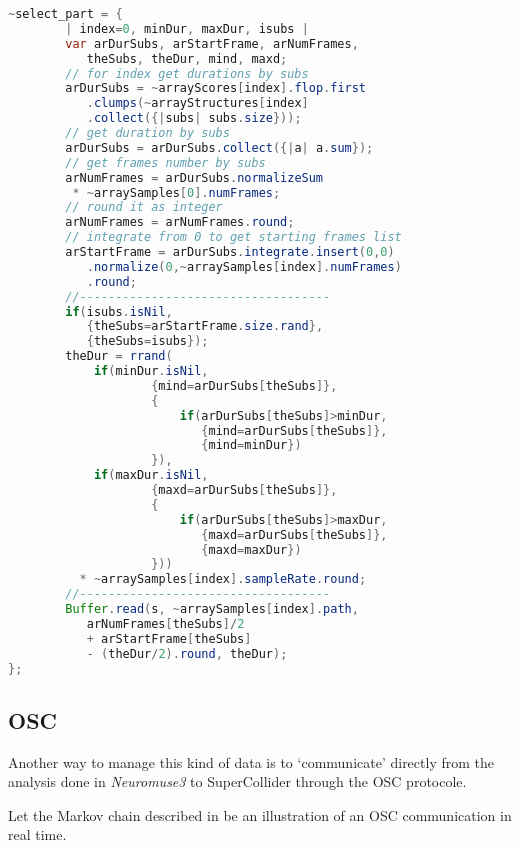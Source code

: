 \begin{enumerate}
 \begin{lstlisting}[basicstyle=\footnotesize\ttfamily,language=Java]
~select_part = {
        | index=0, minDur, maxDur, isubs |
        var arDurSubs, arStartFrame, arNumFrames, 
           theSubs, theDur, mind, maxd;
        // for index get durations by subs
        arDurSubs = ~arrayScores[index].flop.first
           .clumps(~arrayStructures[index]
           .collect({|subs| subs.size}));
        // get duration by subs
        arDurSubs = arDurSubs.collect({|a| a.sum});
        // get frames number by subs
        arNumFrames = arDurSubs.normalizeSum 
	     * ~arraySamples[0].numFrames;
        // round it as integer
        arNumFrames = arNumFrames.round;
        // integrate from 0 to get starting frames list
        arStartFrame = arDurSubs.integrate.insert(0,0)
           .normalize(0,~arraySamples[index].numFrames)
           .round;
        //-----------------------------------
        if(isubs.isNil, 
           {theSubs=arStartFrame.size.rand},
           {theSubs=isubs});
        theDur = rrand(
            if(minDur.isNil, 
                    {mind=arDurSubs[theSubs]},
                    {
                        if(arDurSubs[theSubs]>minDur, 
                           {mind=arDurSubs[theSubs]}, 
                           {mind=minDur})
                    }),
            if(maxDur.isNil, 
                    {maxd=arDurSubs[theSubs]},
                    {
                        if(arDurSubs[theSubs]>maxDur,
                           {maxd=arDurSubs[theSubs]}, 
                           {maxd=maxDur})
                    }))
          * ~arraySamples[index].sampleRate.round;
        //-----------------------------------
        Buffer.read(s, ~arraySamples[index].path, 
           arNumFrames[theSubs]/2 
           + arStartFrame[theSubs]
           - (theDur/2).round, theDur);
};
\end{lstlisting}  
\end{enumerate}

\subsection{OSC}
\label{osc}

Another way to manage this kind of data is to `communicate' directly from the analysis done in \textsl{Neuromuse3} to SuperCollider through the OSC protocole.

\smallskip

Let the Markov chain described in 
 be an illustration of an OSC communication in real time.
 

